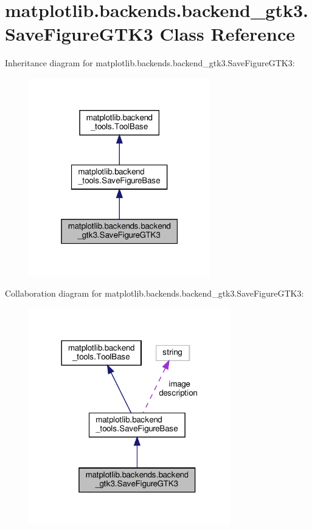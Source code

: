 \hypertarget{classmatplotlib_1_1backends_1_1backend__gtk3_1_1SaveFigureGTK3}{}\section{matplotlib.\+backends.\+backend\+\_\+gtk3.\+Save\+Figure\+G\+T\+K3 Class Reference}
\label{classmatplotlib_1_1backends_1_1backend__gtk3_1_1SaveFigureGTK3}


Inheritance diagram for matplotlib.\+backends.\+backend\+\_\+gtk3.\+Save\+Figure\+G\+T\+K3\+:
\nopagebreak
\begin{figure}[H]
\begin{center}
\leavevmode
\includegraphics[width=223pt]{classmatplotlib_1_1backends_1_1backend__gtk3_1_1SaveFigureGTK3__inherit__graph}
\end{center}
\end{figure}


Collaboration diagram for matplotlib.\+backends.\+backend\+\_\+gtk3.\+Save\+Figure\+G\+T\+K3\+:
\nopagebreak
\begin{figure}[H]
\begin{center}
\leavevmode
\includegraphics[width=248pt]{classmatplotlib_1_1backends_1_1backend__gtk3_1_1SaveFigureGTK3__coll__graph}
\end{center}
\end{figure}
